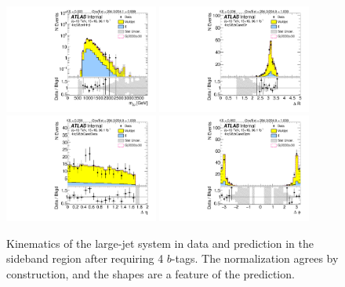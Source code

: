 \begin{figure}[htbp!]
\begin{center}
\includegraphics[width=0.45\textwidth,angle=-90]{figures/boosted/Sideband/b77_FourTag_Sideband_mHH_l_1.pdf}
\includegraphics[width=0.45\textwidth,angle=-90]{figures/boosted/Sideband/b77_FourTag_Sideband_hCandDr.pdf}\\
\includegraphics[width=0.45\textwidth,angle=-90]{figures/boosted/Sideband/b77_FourTag_Sideband_hCandDeta.pdf}
\includegraphics[width=0.45\textwidth,angle=-90]{figures/boosted/Sideband/b77_FourTag_Sideband_hCandDphi.pdf}
  \caption{Kinematics of the large-\R jet system in data and prediction in the sideband region after requiring 4 $b$-tags. The normalization agrees by construction, and the shapes are a feature of the prediction. }
  \label{fig:boosted-4b-sideband-ak10-system}
\end{center}
\end{figure}

